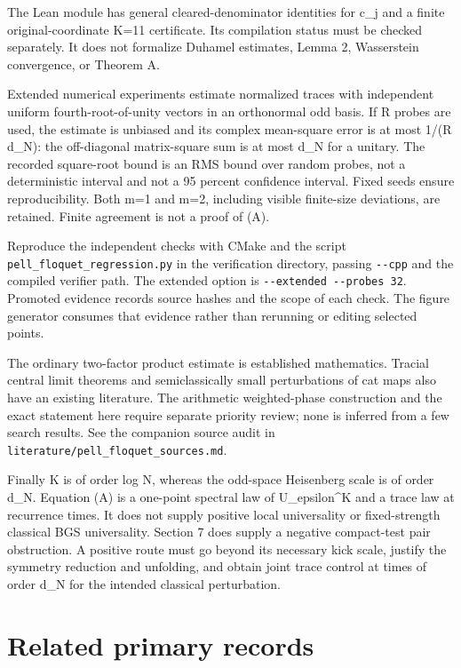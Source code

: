 \documentclass[11pt,a4paper]{article}
\begin{document}
The Lean module has general cleared-denominator identities for c\_j and a finite original-coordinate K=11 certificate. Its compilation status must be checked separately. It does not formalize Duhamel estimates, Lemma 2, Wasserstein convergence, or Theorem A.

Extended numerical experiments estimate normalized traces with independent uniform fourth-root-of-unity vectors in an orthonormal odd basis. If R probes are used, the estimate is unbiased and its complex mean-square error is at most 1/(R d\_N): the off-diagonal matrix-square sum is at most d\_N for a unitary. The recorded square-root bound is an RMS bound over random probes, not a deterministic interval and not a 95 percent confidence interval. Fixed seeds ensure reproducibility. Both m=1 and m=2, including visible finite-size deviations, are retained. Finite agreement is not a proof of (A).

Reproduce the independent checks with CMake and the script \texttt{pell\_floquet\_regression.py} in the verification directory, passing \texttt{-\/-cpp} and the compiled verifier path. The extended option is \texttt{-\/-extended\ -\/-probes\ 32}. Promoted evidence records source hashes and the scope of each check. The figure generator consumes that evidence rather than rerunning or editing selected points.

The ordinary two-factor product estimate is established mathematics. Tracial central limit theorems and semiclassically small perturbations of cat maps also have an existing literature. The arithmetic weighted-phase construction and the exact statement here require separate priority review; none is inferred from a few search results. See the companion source audit in \texttt{literature/pell\_floquet\_sources.md}.

Finally K is of order log N, whereas the odd-space Heisenberg scale is of order d\_N. Equation (A) is a one-point spectral law of U\_epsilon\^{}K and a trace law at recurrence times. It does not supply positive local universality or fixed-strength classical BGS universality. Section 7 does supply a negative compact-test pair obstruction. A positive route must go beyond its necessary kick scale, justify the symmetry reduction and unfolding, and obtain joint trace control at times of order d\_N for the intended classical perturbation.

\hypertarget{related-primary-records}{%
\section{Related primary records}
\small\label{related-primary-records}}
\end{document}
